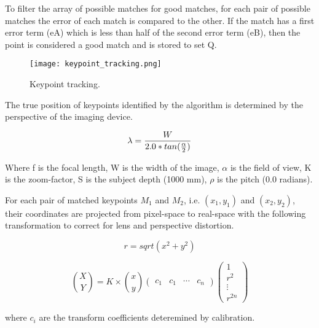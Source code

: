To filter the array of possible matches for good matches, for each
pair of possible matches the error of each match is compared to the
other. If the match has a first error term (eA) which is less than
half of the second error term (eB), then the point is considered a
good match and is stored to set Q.  

\begin{figure}
  \centering
  \texttt{[image: keypoint\_tracking.png]}
  \caption{Keypoint tracking.}
  \label{fig:keypoint_tracking}
\end{figure}

The true position of keypoints identified by the algorithm is
determined by the perspective of the imaging device. 

\begin{equation}
\centering
\lambda = \frac{W}{2.0 * tan(\frac{\alpha}{2})}
\label{eq:geometric}
\end{equation}
\begin{flushleft}
Where f is the focal length, W is the width of the image, $\alpha$ is
the field of view, K is the zoom-factor, S is the subject depth  (1000
mm), $\rho$ is the pitch
(0.0 radians).
\end{flushleft}

For each pair of matched keypoints $M_{1}$ and $M_{2}$,
i.e. $(x_{1},y_{1})$ and $(x_{2},y_{2})$, their coordinates are
projected from pixel-space to real-space with the following
transformation to correct for lens and perspective distortion.

\begin{equation}
r = sqrt(x^2 + y^2)
\label{eq:hypothenus}
\end{equation}

\begin{equation}
\binom{X}{Y} = K \times \binom{x}{y}
\begin{pmatrix}
  c_{1} & c_{1} & \cdots & c_{n}
\end{pmatrix}
\begin{pmatrix}
  1 \\
  r^2 \\
  \vdots \\
  r^{2n}
\end{pmatrix}
\label{eq:undistort}
\end{equation}
\begin{flushleft}
where $c_{i}$ are the transform coefficients deteremined by calibration.
\end{flushleft}

